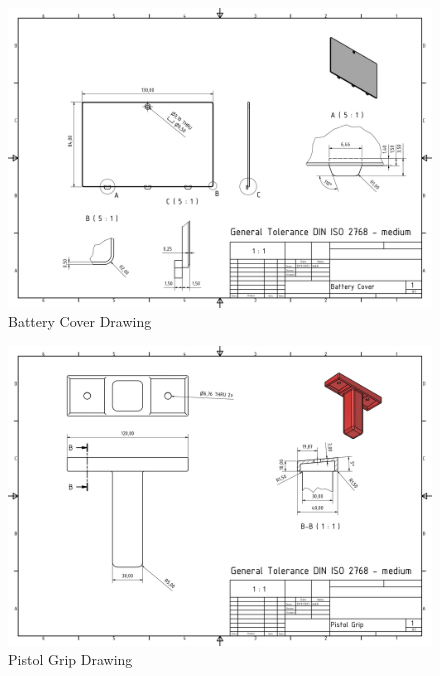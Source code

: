 \begin{figure}[H]
    \centering
    \includegraphics[width=1.3\linewidth, angle = 90]{texs/appendix/data/technicaldrawing/batterycover.jpg}
    \caption{Battery Cover Drawing}
    \label{fig:cad-drawing-batterycover}
\end{figure}

\begin{figure}[H]
    \centering
    \includegraphics[width=1.3\linewidth, angle = 90]{texs/appendix/data/technicaldrawing/pistolgrip.jpg}
    \caption{Pistol Grip Drawing}
    \label{fig:cad-drawing-pistolgrip}
\end{figure}

